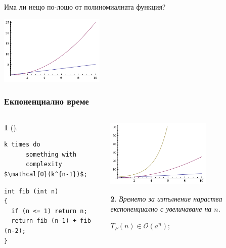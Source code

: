 \documentclass{beamer}
\newtheorem*{remark}{}
\begin{document}
\begin{frame}
\centerline{Има ли нещо по-лошо от полиномиалната функция?}

\begin{center}
  \includegraphics[width=5cm]{images/quadraticf}
\end{center}
\end{frame}


\begin{frame}[fragile]
\frametitle{Екпоненциално време}

\vspace{-30px}

\begin{columns}[t]
  \begin{column}{0.6\textwidth}
\begin{remark}[]
  \begin{lstlisting}[mathescape]
  k times do 
      something with 
      complexity $\mathcal{O}(k^{n-1})$;
  \end{lstlisting}
\end{remark}

\begin{flushleft}
\begin{lstlisting}
int fib (int n)
{
  if (n <= 1) return n;
  return fib (n-1) + fib (n-2);
}
\end{lstlisting}
\end{flushleft}




  \end{column}
  \begin{column}{0.4\textwidth}

   \includegraphics[width=5cm]{images/exponential}
    \begin{flushleft}
    \begin{remark}
      Времето за изпълнение нараства експоненциално с увеличаване на $n$.

      $T_P(n) \in \mathcal{O}(a^n);$
    \end{remark}
      
    \end{flushleft}


  \end{column}
\end{columns}

\end{frame}
\end{document}
